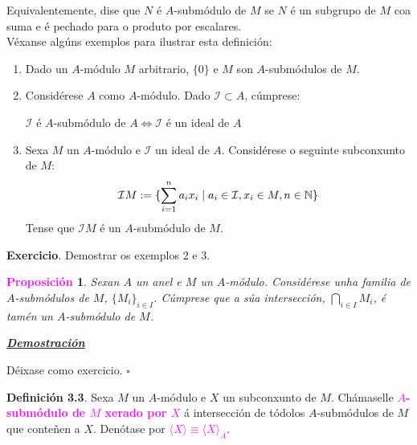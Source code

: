 \documentclass[twoside]{report}
\newcommand{\magbf}[1]{\textcolor{magenta}{\textbf{#1}}} %
\theoremstyle{mystyle}
\newtheorem{prop}{\magbf{Proposición}}[chapter]
\newenvironment{proposition}
{\begin{mdframed}[linecolor = magenta,backgroundcolor = classicrose, linewidth = 2mm]\begin{prop}}
{\end{prop}\end{mdframed}}
\begin{document}
\noindent Equivalentemente, dise que $N$ é $A$-submódulo de $M$ se $N$ é un subgrupo de $M$ coa suma e é pechado para o produto por escalares.\\

\noindent Véxanse algúns exemplos para ilustrar esta definición:\\

\begin{enumerate}
    \item Dado un $A$-módulo $M$ arbitrario, $\{0\}$ e $M$ son $A$-submódulos de $M$.
    \item Considérese $A$ como $A$-módulo. Dado $\mathcal{I} \subset A$, cúmprese:
    \begin{center}
        $\mathcal{I}$ é $A$-submódulo de $A \Longleftrightarrow \mathcal{I}$ é un ideal de $A$ 
    \end{center}
    \item Sexa $M$ un $A$-módulo e $\mathcal{I}$ un ideal de $A$. Considérese o seguinte subconxunto de $M$:
    $$\mathcal{I}M := \{\displaystyle \sum_{i = 1}^{n}a_{i}x_{i} \hspace{1mm} | \hspace{1mm} a_{i} \in \mathcal{I}, x_{i} \in M, n \in \mathbb{N}\}$$
    Tense que $\mathcal{I}M$ é un $A$-submódulo de $M$.
\end{enumerate}

\vspace{3mm}

\noindent \textbf{Exercicio}. Demostrar os exemplos 2 e 3.\\

\begin{proposition} \label{prop3.1}
Sexan $A$ un anel e $M$ un $A$-módulo. Considérese unha familia de $A$-submódulos de $M$, $\{M_{i}\}_{i \in I}$. Cúmprese que a súa intersección, $\underset{i \in I}{\bigcap}M_{i}$, é tamén un $A$-submódulo de $M$.
\end{proposition}

\vspace{2mm}

\noindent \textbf{\textit{\underline{Demostración}}}

\vspace{2mm}

\noindent Déixase como exercicio. $\square$\\

\vspace{3mm}

\noindent \textbf{Definición 3.3}. Sexa $M$ un $A$-módulo e $X$ un subconxunto de $M$. Chámaselle \magbf{$A$-submódulo de $M$ xerado por $X$} á intersección de tódolos $A$-submódulos de $M$ que conteñen a $X$. Denótase por \magbf{$\langle X \rangle \equiv \langle X \rangle_{A}$}.
\begin{center}
\end{center}
\end{document}
